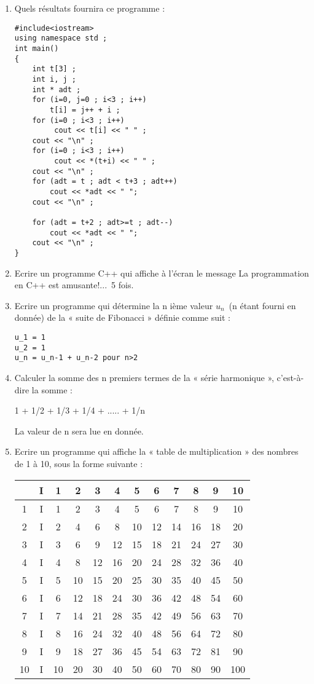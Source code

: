 \documentclass[a4paper, oneside,11pt]{book}
\begin{document}
\begin{enumerate}
\item Quels r\'esultats fournira ce programme :
\begin{lstlisting}
#include<iostream>
using namespace std ;
int main()
{
    int t[3] ;
    int i, j ;
    int * adt ;
    for (i=0, j=0 ; i<3 ; i++) 
        t[i] = j++ + i ;
    for (i=0 ; i<3 ; i++)
         cout << t[i] << " " ;
    cout << "\n" ;
    for (i=0 ; i<3 ; i++)
         cout << *(t+i) << " " ;
    cout << "\n" ; 
    for (adt = t ; adt < t+3 ; adt++)
        cout << *adt << " ";
    cout << "\n" ;

    for (adt = t+2 ; adt>=t ; adt--) 
        cout << *adt << " ";
    cout << "\n" ;
}
\end{lstlisting}
\item Ecrire un programme C++ qui affiche \`a l'\'ecran le message \og La programmation en C++ est amusante!...\fg\ 5 fois.

\item Ecrire un programme qui d\'etermine la n i\`eme valeur $u_n$\ (n \'etant fourni en donn\'ee) de la « suite de
Fibonacci » d\'efinie comme suit :

\begin{verbatim}
u_1 = 1
u_2 = 1
u_n = u_n-1 + u_n-2 pour n>2
\end{verbatim}
\item Calculer la somme des n premiers termes de la « s\'erie harmonique », c'est-\`a-dire la somme :

1 + 1/2 + 1/3 + 1/4 + ..... + 1/n

La valeur de n sera lue en donn\'ee. 


\item Ecrire un programme qui affiche la « table de multiplication » des nombres de 1 \`a 10, sous la forme
suivante :

\begin{table}[hhhh]
\begin{center}
\begin{tabular}{cccccccccccc}
& I & 1 & 2 & 3 & 4 & 5 & 6 & 7 & 8 & 9 & 10\\
\hline
1& I& 1& 2& 3 &4& 5& 6 &7& 8& 9& 10\\
2 &I &2& 4 &6 &8 &10 &12 &14& 16& 18 &20\\
3 &I& 3& 6& 9& 12& 15 &18& 21& 24& 27& 30\\
4 &I &4& 8 &12& 16 &20 &24 &28 &32 &36& 40\\
5 & I &5 &10 &15 &20& 25& 30 &35& 40& 45& 50\\
6 &I &6& 12& 18 &24 &30 &36 &42& 48 &54& 60\\
7 &I& 7& 14& 21 &28& 35 &42 &49& 56& 63& 70\\
8 &I &8 &16& 24& 32& 40& 48&56 &64& 72& 80\\
9 &I &9 &18&27& 36 &45& 54& 63 &72& 81& 90\\
10 & I& 10& 20& 30 &40& 50 &60& 70& 80 &90& 100\\
\end{tabular}
\end{center}
\end{table}


\end{enumerate}
\end{document}
